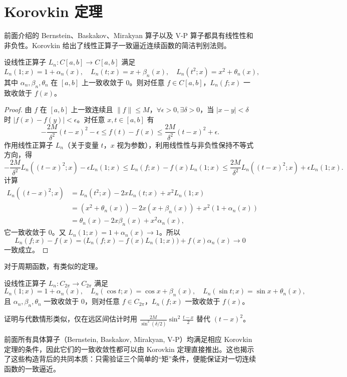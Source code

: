 \section{Korovkin 定理}

前面介绍的 Bernstein、Baskakov、Mirakyan 算子以及 V-P 算子都具有线性性和非负性。Korovkin 给出了线性正算子一致逼近连续函数的简洁判别法则。

\begin{theorem}
设线性正算子 $L_n: C[a,b]\to C[a,b]$ 满足
\[
L_n(1;x)=1+\alpha_n(x),\quad L_n(t;x)=x+\beta_n(x),\quad L_n(t^2;x)=x^2+\theta_n(x),
\]
其中 $\alpha_n,\beta_n,\theta_n$ 在 $[a,b]$ 上一致收敛于 $0$。则对任意 $f\in C[a,b]$，$L_n(f;x)$ 一致收敛于 $f(x)$。
\end{theorem}

\begin{proof}
由 $f$ 在 $[a,b]$ 上一致连续且 $\|f\|\le M$，$\forall \epsilon>0,\exists\delta>0$，当 $|x-y|<\delta$ 时 $|f(x)-f(y)|<\epsilon$。对任意 $x,t\in[a,b]$ 有
\[
-\frac{2M}{\delta^2}(t-x)^2 - \epsilon \le f(t)-f(x) \le \frac{2M}{\delta^2}(t-x)^2 + \epsilon.
\]
作用线性正算子 $L_n$（关于变量 $t$，$x$ 视为参数），利用线性性与非负性保持不等式方向，得
\[
-\frac{2M}{\delta^2}L_n((t-x)^2;x)-\epsilon L_n(1;x)
\le L_n(f;x)-f(x)L_n(1;x)
\le \frac{2M}{\delta^2}L_n((t-x)^2;x)+\epsilon L_n(1;x).
\]
计算
\begin{align*}
L_n((t-x)^2;x)
&= L_n(t^2;x) - 2xL_n(t;x) + x^2L_n(1;x)\\
&= (x^2+\theta_n(x)) - 2x(x+\beta_n(x)) + x^2(1+\alpha_n(x))\\
&= \theta_n(x) - 2x\beta_n(x) + x^2\alpha_n(x),
\end{align*}
它一致收敛于 $0$。又 $L_n(1;x)=1+\alpha_n(x)\to 1$。所以
\[
L_n(f;x) - f(x) = \big(L_n(f;x)-f(x)L_n(1;x)\big) + f(x)\alpha_n(x) \to 0
\]
一致成立。
\end{proof}

对于周期函数，有类似的定理。
\begin{theorem}
设线性正算子 $L_n: C_{2\pi}\to C_{2\pi}$ 满足
\[
L_n(1;x)=1+\alpha_n(x),\quad L_n(\cos t;x)=\cos x+\beta_n(x),\quad L_n(\sin t;x)=\sin x+\theta_n(x),
\]
且 $\alpha_n,\beta_n,\theta_n$ 一致收敛于 $0$，则对任意 $f\in C_{2\pi}$，$L_n(f;x)$ 一致收敛于 $f(x)$。
\end{theorem}
证明与代数情形类似，仅在远区间估计时用 $\frac{2M}{\sin^2(\delta/2)}\sin^2\frac{t-x}{2}$ 替代 $(t-x)^2$。

前面所有具体算子（Bernstein, Baskakov, Mirakyan, V-P）均满足相应 Korovkin 定理的条件，因此它们的一致收敛性都可以由 Korovkin 定理直接推出。这也揭示了这些构造背后的共同本质：只需验证三个简单的“矩”条件，便能保证对一切连续函数的一致逼近。